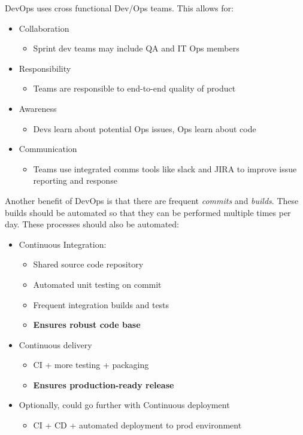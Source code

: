 \documentclass[11pt,a4paper,titlepage,dvipsnames,cmyk]{scrartcl}
\begin{document}
DevOps uses cross functional Dev/Ops teams. This allows for:
\begin{itemize}
    \item Collaboration
    \begin{itemize}
        \item Sprint dev teams may include QA and IT Ops members
    \end{itemize}
    \item Responsibility
    \begin{itemize}
        \item Teams are responsible to end-to-end quality of product
    \end{itemize}
    \item Awareness
    \begin{itemize}
        \item Devs learn about potential Ops issues, Ops learn about code
    \end{itemize}
    \item Communication
    \begin{itemize}
        \item Teams use integrated comms tools like slack and JIRA to improve issue reporting and response
    \end{itemize}
\end{itemize}

Another benefit of DevOps is that there are frequent \textit{commits} and \textit{builds}. These builds should be automated so that they can be performed multiple times per day. These processes should also be automated:
\begin{itemize}
    \item Continuous Integration:
    \begin{itemize}
        \item Shared source code repository
        \item Automated unit testing on commit
        \item Frequent integration builds and tests
        \item \textbf{Ensures robust code base}
    \end{itemize}
    \item Continuous delivery
    \begin{itemize}
        \item CI + more testing + packaging
        \item \textbf{Ensures production-ready release}
    \end{itemize}
    \item Optionally, could go further with Continuous deployment
    \begin{itemize}
        \item CI + CD + automated deployment to prod environment
    \end{itemize}
\end{itemize}
\end{document}
